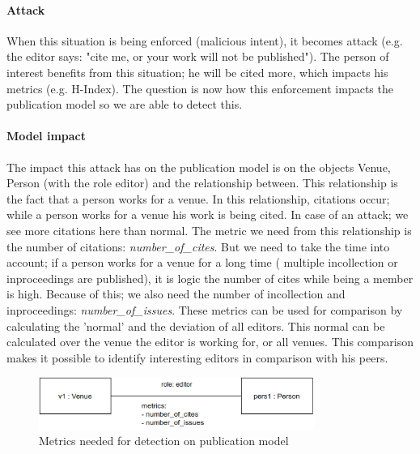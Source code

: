 \documentclass{ou-report}
\begin{document}
\paragraph{Attack} When this situation is being enforced (malicious intent), it 
becomes attack (e.g. the editor says: "cite me, or your work will not be 
published"). The person of interest benefits 
from this situation; he will be cited more, which impacts his metrics (e.g. 
H-Index). The question is now how this enforcement impacts the 
publication model so we are able to detect this. 

\paragraph{Model impact}
The impact this attack has on the publication model is on the objects Venue, 
Person (with the role editor) and the relationship between. This relationship is 
the fact that a person works for a venue. In this relationship, citations occur; 
while a person works for a venue his work is being cited. In case of an attack; 
we see more citations here than normal. The metric we need from this 
relationship is the number of citations: \textit{number\_of\_cites}. But we need 
to take the time into account; if a person works for a venue for a long time (
multiple incollection or inproceedings are published), it is logic the number of 
cites while being a member is high. Because of this; we also need the number 
of incollection and inproceedings: \textit{number\_of\_issues}.
These metrics can be used for comparison by calculating the 'normal' and the 
deviation of all editors. This normal can be calculated over the venue the 
editor is working for, or all venues. This comparison makes it possible to 
identify interesting editors in comparison with his peers.

\begin{figure}[H]
\centering
\includegraphics[width=9cm]{images/cite_work_editorial_boardmodel_impact.drawio.png}
\caption{Metrics needed for detection on publication model}
\label{fig:cwebimpact}
\end{figure}
\end{document}
